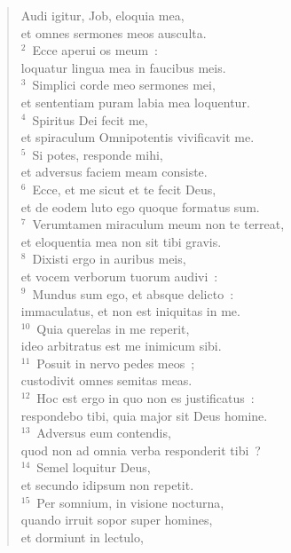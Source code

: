 \begin{flushleft}\begin{verse}\vspace{-19pt}\hspace{6pt}Audi igitur, Job, eloquia mea,\\\hspace{6pt} et omnes sermones meos ausculta.\\
${}^{2}$~Ecce aperui os meum~:\\ loquatur lingua mea in faucibus meis.\\
${}^{3}$~Simplici corde meo sermones mei,\\ et sententiam puram labia mea loquentur.\\
${}^{4}$~Spiritus Dei fecit me,\\ et spiraculum Omnipotentis vivificavit me.\\
${}^{5}$~Si potes, responde mihi,\\ et adversus faciem meam consiste.\\
${}^{6}$~Ecce, et me sicut et te fecit Deus,\\ et de eodem luto ego quoque formatus sum.\\
${}^{7}$~Verumtamen miraculum meum non te terreat,\\ et eloquentia mea non sit tibi gravis.\\
${}^{8}$~Dixisti ergo in auribus meis,\\ et vocem verborum tuorum audivi~:\\
${}^{9}$~Mundus sum ego, et absque delicto~:\\ immaculatus, et non est iniquitas in me.\\
${}^{10}$~Quia querelas in me reperit,\\ ideo arbitratus est me inimicum sibi.\\
${}^{11}$~Posuit in nervo pedes meos~;\\ custodivit omnes semitas meas.\\
${}^{12}$~Hoc est ergo in quo non es justificatus~:\\ respondebo tibi, quia major sit Deus homine.\\
${}^{13}$~Adversus eum contendis,\\ quod non ad omnia verba responderit tibi~?\\
${}^{14}$~Semel loquitur Deus,\\ et secundo idipsum non repetit.\\
${}^{15}$~Per somnium, in visione nocturna,\\ quando irruit sopor super homines,\\ et dormiunt in lectulo,\\

\end{verse}
\end{flushleft}
